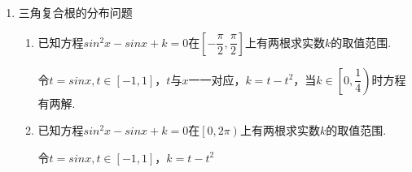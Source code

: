 \begin{enumerate}
\begin{enumerate}
\begin{jieda}
        $cost = \dfrac{1}{2}$的解集为$\{x| x = \pm \dfrac{\pi}{3} + 2k\pi, k \in \mathbf{Z}\}$，
        
        故存在长度为$2\omega \pi$的区间与$\{x| x = \pm \dfrac{\pi}{3} + 2k\pi, k \in \mathbf{Z}\}$有且仅有两个公共元素，数形结合可知$2\omega\pi \in \left[\dfrac{2\pi}{3}, \dfrac{10\pi}{3}\right)$，即$\omega \in \left[\dfrac{1}{3}, \dfrac{5}{3}\right)$
    \end{jieda}
    
    \item 已知函数 $f\left( x\right)  = \sin {\omega x} + \sqrt{3}\cos {\omega x}$ ,若存在 $0 < {x}_{1} < {x}_{2} < \dfrac{\pi }{2}$ ,使得 $f\left( {x}_{1}\right)  - f\left( {x}_{2}\right) = -4$,则正数$\omega$的取值范围是
    \begin{jieda}
        $f(x) = 2sin(\omega x + \dfrac{\pi}{3})$，令$t = \omega x + \dfrac{\pi}{3}$，则存在 $\dfrac{\pi}{3} < {t}_{1} < {t}_{2} < \dfrac{\omega\pi}{2}+\dfrac{\pi}{3}$，使得$sint_1 = -1, sint_2 = 1$，故$t_1 = \dfrac{3\pi}{2}, t_2 = \dfrac{5\pi}{2} + 2k\pi, k \in \mathbf{N}$，故$\dfrac{\omega\pi}{2}+\dfrac{\pi}{3} > \dfrac{5\pi}{2}$，故$\omega \in \left(\dfrac{13}{3}, +\infty\right)$
    \end{jieda}

    \item 已知 $f\left( x\right)  = \left| {\sin {\omega x}}\right|$ ，若存在 ${x}_{1}$ 、 ${x}_{2} \in  \left\lbrack  {{\omega \pi },{2\omega \pi }}\right\rbrack$ ，且 ${x}_{1} \neq  {x}_{2}$ ，使得 $\dfrac{1}{f\left( {x}_{1}\right)  + 1} + \dfrac{1}{f\left( {x}_{2}\right)  + 1} = 1$ 成立，则 $\omega$ 的取值范围是.
    \begin{jieda}
        原问题转化为$y = sinx$在$[\omega^2\pi, 2\omega^2\pi]$上存在至少两个对称轴.
    \end{jieda}
\end{enumerate}

\item 三角复合根的分布问题
\begin{enumerate}
    \item 已知方程$sin^2x - sinx + k = 0$在$\left[-\dfrac{\pi}{2}, \dfrac{\pi}{2}\right]$上有两根求实数$k$的取值范围.
    \begin{jieda}
        令$t = sinx, t \in [-1, 1]$，$t$与$x$一一对应，$k = t - t^2$，当$k \in \left[0, \dfrac{1}{4}\right)$时方程有两解.
    \end{jieda}
    \item 已知方程$sin^2x - sinx + k = 0$在$\left[0, 2\pi\right)$上有两根求实数$k$的取值范围.
    \begin{jieda}
        令$t = sinx, t \in [-1, 1]$，$k = t - t^2$


\end{jieda}
\end{enumerate}
\end{enumerate}
